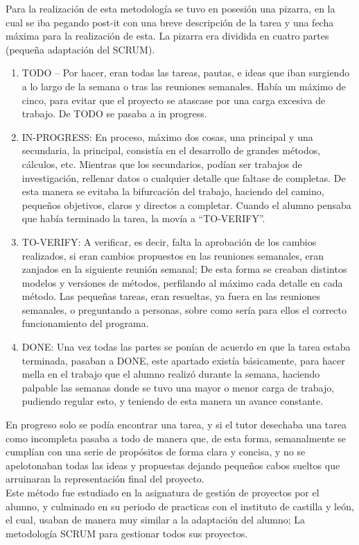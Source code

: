 Para la realización de esta metodología se tuvo en posesión una pizarra, en la cual se iba pegando post-it con una breve descripción de la tarea y una fecha máxima para la realización de esta. La pizarra era dividida en cuatro partes (pequeña adaptación del SCRUM).\\
\begin{enumerate}
\item	TODO – Por hacer, eran todas las tareas, pautas, e ideas que iban surgiendo a lo largo de la semana o tras las reuniones semanales. Había un máximo de cinco, para evitar que el proyecto se atascase por una carga excesiva de trabajo. De TODO se pasaba a in progress. 
\item	IN-PROGRESS: En proceso, máximo dos cosas, una principal y una secundaria, la principal, consistía en el desarrollo de grandes métodos, cálculos, etc. Mientras que los secundarios, podían ser trabajos de investigación, rellenar datos o cualquier detalle que faltase de completas. De esta manera se evitaba la bifurcación del trabajo, haciendo del camino, pequeños objetivos, claros y directos a completar. Cuando el alumno pensaba que había terminado la tarea, la movía a “TO-VERIFY”.
\item	TO-VERIFY: A verificar, es decir, falta la aprobación de los cambios realizados, si eran cambios propuestos en las reuniones semanales, eran zanjados en la siguiente reunión semanal; De esta forma se creaban distintos modelos y versiones de métodos, perfilando al máximo cada detalle en cada método. Las pequeñas tareas, eran resueltas, ya fuera en las reuniones semanales, o preguntando a personas, sobre como sería para ellos el correcto funcionamiento del programa.
\item	DONE: Una vez todas las partes se ponían de acuerdo en que la tarea estaba terminada, pasaban a DONE, este apartado existía básicamente, para hacer mella en el trabajo que el alumno realizó durante la semana, haciendo palpable las semanas donde se tuvo una mayor o menor carga de trabajo, pudiendo regular esto, y teniendo de esta manera un avance constante.
\end{enumerate}
En progreso solo se podía encontrar una tarea, y si el tutor desechaba una tarea como incompleta pasaba a todo de manera que, de esta forma, semanalmente se cumplían con una serie de propósitos de forma clara y concisa, y no se apelotonaban todas las ideas y propuestas dejando pequeños cabos sueltos que arruinaran la representación final del proyecto. \\
Este método fue estudiado en la asignatura de gestión de proyectos por el alumno, y culminado en su periodo de practicas con el instituto de castilla y león, el cual, usaban de manera muy similar a la adaptación del alumno; La metodología SCRUM para gestionar todos sus proyectos.
